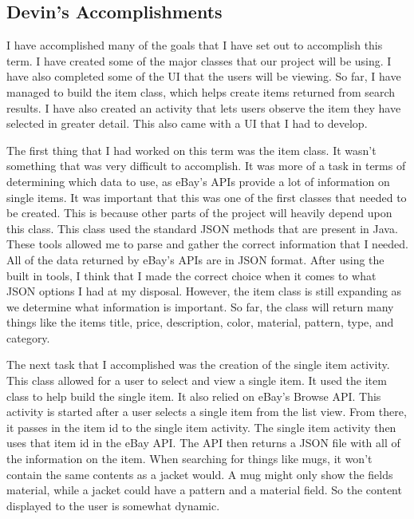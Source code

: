 \documentclass[journal,compsoc, 10pt, draftclsnofoot, onecolumn]{IEEEtran}
\begin{document}
\subsection{Devin's Accomplishments}
I have accomplished many of the goals that I have set out to accomplish this 
term. I have created some of the major classes that our project will be using. 
I have also completed some of the UI that the users will be viewing. So far, 
I have managed to build the item class, which helps create items returned from 
search results. I have also created an activity that lets users observe the 
item they have selected in greater detail. This also came with a UI that I had 
to develop.\newline

The first thing that I had worked on this term was the item class. It wasn't 
something that was very difficult to accomplish. It was more of a task in terms 
of determining which data to use, as eBay's APIs provide a lot of information 
on single items. It was important that this was one of the first classes that 
needed to be created. This is because other parts of the project will heavily 
depend upon this class. This class used the standard JSON methods that are 
present in Java. These tools allowed me to parse and gather the correct 
information that I needed. All of the data returned by eBay's APIs are in 
JSON format. After using the built in tools, I think that I made the correct 
choice when it comes to what JSON options I had at my disposal. However, the 
item class is still expanding as we determine what information is 
important. So far, the class will return many things like the items title, 
price, description, color, material, pattern, type, and category. \newline

The next task that I accomplished was the creation of the single item activity. 
This class allowed for a user to select and view a single item. It used the item 
class to help build the single item. It also relied on eBay's Browse API. This 
activity is started after a user selects a single item from the list view. From 
there, it passes in the item id to the single item activity. The single item 
activity then uses that item id in the eBay API. The API then returns a JSON file 
with all of the information on the item. When searching for things like mugs, it 
won't contain the same contents as a jacket would. A mug might only show the 
fields material, while a jacket could have a pattern and a material field. 
So the content displayed to the user is somewhat dynamic. \newline
\end{document}
